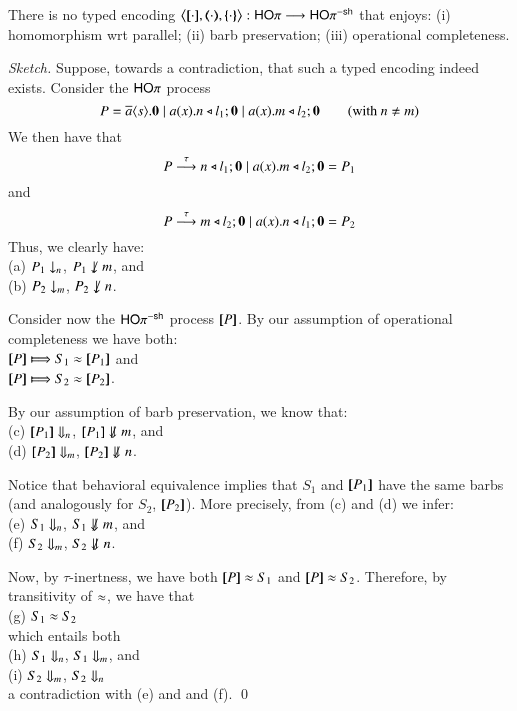 \begin{theorem}\rm
	There is no typed encoding $\enco{\map{\cdot}, \mapt{\cdot}, \mapa{\cdot}}: \HOp \longrightarrow \HOp^{\minussh}$
	that enjoys: (i) homomorphism wrt parallel; (ii) barb preservation; (iii) operational completeness.
\end{theorem}

\begin{proof}[Sketch]
Suppose, towards a contradiction, that such a typed encoding indeed exists. 
Consider the $\mathsf{HO}\pi$ process
$$
P = \overline{a} \langle s \rangle . \mathbf{0} \;|\; a (x) . n \triangleleft l_1 ; \mathbf{0} \;|\; a (x) . m \triangleleft l_2 ; \mathbf{0} \qquad \text{(with $n \neq m$)}
$$
We then have that
$$P \stackrel{\tau}{\longrightarrow} n \triangleleft l_1 ; \mathbf{0} \;|\; a (x) . m \triangleleft l_2 ; \mathbf{0} = P_1$$
and
$$P \stackrel{\tau}{\longrightarrow} m \triangleleft l_2 ; \mathbf{0} \;|\; a (x) . n \triangleleft l_1 ; \mathbf{0} = P_2$$
Thus, we clearly have:\\
(a) $P_1 \downarrow_{n}$, $P_1 \not \barb{m}$, and \\
(b) $P_2 \downarrow_{m}$, $P_2 \not \barb{n}$.

Consider now the $\mathsf{HO}\pi^{\mathsf{-sh}}$ process $[\!\![P]\!\!]$.
By our assumption of operational completeness we have both:\\
$\map{P} \Hby{} S_1 \wb \map{P_1}$
and \\
$\map{P} \Hby{} S_2 \wb \map{P_2}$.

By our assumption of barb preservation, 
we know that: \\
(c) $[\!\![P_1]\!\!] \Downarrow_{n}$, $\map{P_1} \not \Barb{m}$, and \\
(d) $[\!\![P_2]\!\!] \Downarrow_{m}$, $\map{P_2} \not \Barb{n}$.



Notice that behavioral equivalence implies that $S_1$ and $[\!\![P_1]\!\!]$  have the same barbs
(and analogously for $S_2$, $[\!\![P_2]\!\!]$). More precisely, from (c) and (d) we infer: \\
(e) $S_1 \Downarrow_{n}$, $S_1 \not \Barb{m}$, and \\
(f) $S_2 \Downarrow_{m}$, $S_2 \not \Barb{n}$.

Now, by $\tau$-inertness, we have both 
$[\!\![P]\!\!] \approx S_1$ and 
$[\!\![P]\!\!] \approx S_2$.
Therefore, by transitivity of $\approx$, we have that \\
(g) $S_1 \approx S_2$\\
which entails both \\
(h) $S_1 \Downarrow_{n}$, $S_ 1 \Downarrow_{m}$, and \\
(i) $S_2 \Downarrow_{m}$, $S_2 \Downarrow_{n}$ \\
a contradiction with (e) and and (f).
\qed
\end{proof}

